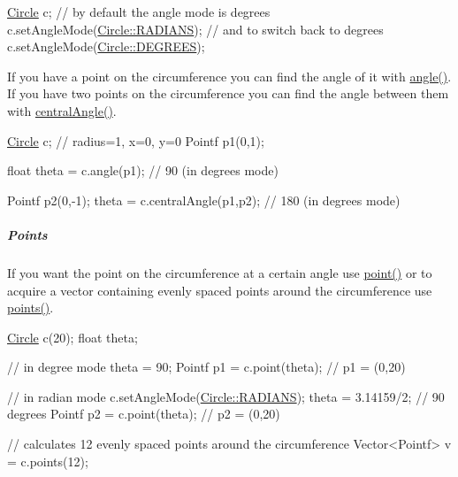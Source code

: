 \begin{DoxyCode}
\hyperlink{classprism_1_1geometry_1_1_circle_a7d9e34947cf139b50f5730ed7711b4a4}{Circle} c; \textcolor{comment}{// by default the angle mode is degrees}
c.setAngleMode(\hyperlink{classprism_1_1geometry_1_1_circle_abf09b3319057626836fd7446ee1ac074a505eab4762e08f35c8381febeb2fc11f}{Circle::RADIANS});
\textcolor{comment}{// and to switch back to degrees}
c.setAngleMode(\hyperlink{classprism_1_1geometry_1_1_circle_abf09b3319057626836fd7446ee1ac074a129fdcf5e1cb41ce9c1b9a7614add31a}{Circle::DEGREES});
\end{DoxyCode}


If you have a point on the circumference you can find the angle of it with \hyperlink{classprism_1_1geometry_1_1_circle_a48b7121373194162c3268247213e4dc4}{angle()}. If you have two points on the circumference you can find the angle between them with \hyperlink{classprism_1_1geometry_1_1_circle_aec4c8f61f3b7e3143da75fc2d42973c4}{central\+Angle()}.


\begin{DoxyCode}
\hyperlink{classprism_1_1geometry_1_1_circle_a7d9e34947cf139b50f5730ed7711b4a4}{Circle} c; \textcolor{comment}{// radius=1, x=0, y=0}
Pointf p1(0,1);

\textcolor{keywordtype}{float} theta = c.angle(p1); \textcolor{comment}{// 90 (in degrees mode)}

Pointf p2(0,-1);
theta = c.centralAngle(p1,p2); \textcolor{comment}{// 180 (in degrees mode)}
\end{DoxyCode}


\subparagraph*{Points}

If you want the point on the circumference at a certain angle use \hyperlink{classprism_1_1geometry_1_1_circle_ac9f3831443459d81b0d0bc47bcfb0382}{point()} or to acquire a vector containing evenly spaced points around the circumference use \hyperlink{classprism_1_1geometry_1_1_circle_a143bf607852529ec21a1aaaa9c34228f}{points()}.


\begin{DoxyCode}
\hyperlink{classprism_1_1geometry_1_1_circle_a7d9e34947cf139b50f5730ed7711b4a4}{Circle} c(20);
\textcolor{keywordtype}{float} theta;

\textcolor{comment}{// in degree mode}
theta = 90;
Pointf p1 = c.point(theta); \textcolor{comment}{// p1 = (0,20)}

\textcolor{comment}{// in radian mode}
c.setAngleMode(\hyperlink{classprism_1_1geometry_1_1_circle_abf09b3319057626836fd7446ee1ac074a505eab4762e08f35c8381febeb2fc11f}{Circle::RADIANS});
theta = 3.14159/2; \textcolor{comment}{// 90 degrees}
Pointf p2 = c.point(theta); \textcolor{comment}{// p2 = (0,20)}

\textcolor{comment}{// calculates 12 evenly spaced points around the circumference}
Vector<Pointf> v = c.points(12);
\end{DoxyCode}


